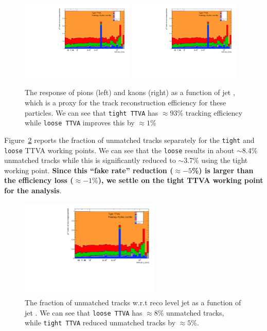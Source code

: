 \begin{figure}[tb]
\centering
\includegraphics[width=0.48\textwidth, page=4]{figures/jet_comp_study_powheg_Tight_pTFraction_mc16e.pdf}
\includegraphics[width=0.48\textwidth, page=5]{figures/jet_comp_study_powheg_Tight_pTFraction_mc16e.pdf}
\caption {The \pt{} response of pions (left) and  kaons (right) as a function of jet \pt{}, which is a proxy for the track reconstruction efficiency for these particles. 
We can see that \texttt{tight TTVA} has $\approx 93$\% tracking efficiency while \texttt{loose TTVA} improves this by $\approx 1$\%}
\label{fig:r_pion_kaon}
\end{figure}

Figure~\ref{fig:frac_unmatchedtracks} reports the \pt{} fraction of unmatched tracks separately for the \texttt{tight} and \texttt{loose} TTVA working points.
We can see that the \texttt{loose} results in about $\sim$8.4\% unmatched tracks while this is significantly reduced to $\sim$3.7\% using the tight working point.
\textbf{Since this ``fake rate'' reduction ($\approx -5$\%) is larger than the efficiency loss ($\approx -1\%$), we settle on the tight TTVA working point for the analysis}.

\begin{figure}[b]
\centering
\includegraphics[width=0.6\textwidth, page=16]{figures/jet_comp_study_powheg_Tight_pTFraction_mc16e.pdf}
\caption {The fraction of unmatched tracks w.r.t reco level jet as a function of jet \pT. We can see that \texttt{loose TTVA} has $\approx 8$\% unmatched tracks, while \texttt{tight TTVA} reduced unmatched tracks by $\approx 5$\%.}
\label{fig:frac_unmatchedtracks}
\end{figure}


